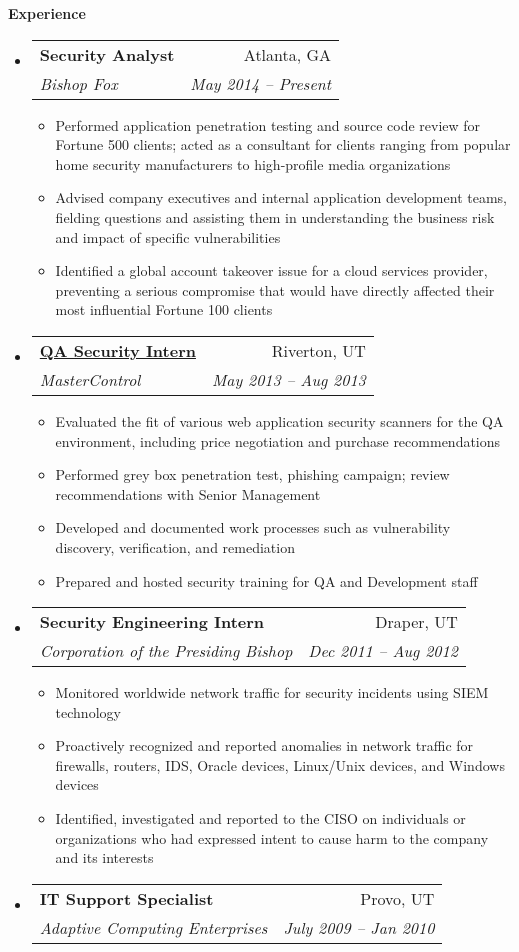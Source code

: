 \documentclass[letterpaper,11pt]{article}
\makeatletter
\newcommand{\resitem}[1]{\item #1 \vspace{-2pt}}
\newcommand{\resheading}[1]{{\large \colorbox{mygrey}{\begin{minipage}{\textwidth}{\textbf{#1 \vphantom{p\^{E}}}}\end{minipage}}}}
\newcommand{\ressubheading}[4]{
\begin{tabular*}{6.5in}{l@{\extracolsep{\fill}}r}
		\textbf{#1} & #2 \\
		\textit{#3} & \textit{#4} \\
\end{tabular*}\vspace{-6pt}}
\makeatother
\begin{document}
\resheading{Experience}
	\begin{itemize}
	\item
			\ressubheading{Security Analyst}{Atlanta, GA}{Bishop Fox}{May 2014 -- Present}
			{ \footnotesize
			\begin{itemize}
				\resitem{Performed application penetration testing and source code review for Fortune 500 clients; acted as a consultant for clients ranging from popular home security manufacturers to high-profile media organizations}
				\resitem{Advised company executives and internal application development teams, fielding questions and assisting them in understanding the business risk and impact of specific vulnerabilities}
				\resitem{Identified a global account takeover issue for a cloud services provider, preventing a serious compromise that would have directly affected their most influential Fortune 100 clients}
			\end{itemize}
			}
		\item 
			\ressubheading{\href{}{QA Security Intern}}{Riverton, UT}{MasterControl}{May 2013 -- Aug 2013}
				{ \footnotesize
				\begin{itemize}
					\resitem{Evaluated the fit of various web application security scanners for the QA environment, including price negotiation and purchase recommendations}
					\resitem{Performed grey box penetration test, phishing campaign; review recommendations with Senior Management}
					\resitem{Developed and documented work processes such as vulnerability discovery, verification, and remediation}
					\resitem{Prepared and hosted security training for QA and Development staff}
				\end{itemize}
				}
		\item			
			\ressubheading{Security Engineering Intern}{Draper, UT}{Corporation of the Presiding Bishop}{Dec 2011 -- Aug 2012}
				{ \footnotesize				
				\begin{itemize}
					\resitem{Monitored worldwide network traffic for security incidents using SIEM technology}
					\resitem{Proactively recognized and reported anomalies in network traffic for firewalls, routers, IDS, Oracle devices, Linux/Unix devices, and Windows devices}
					\resitem{Identified, investigated and reported to the CISO on individuals or organizations who had expressed intent to cause harm to the company and its interests}
				\end{itemize}
				}
		\item 
			\ressubheading{IT Support Specialist}{Provo, UT}{Adaptive Computing Enterprises}{July 2009 -- Jan 2010}

\end{itemize}
\end{document}
